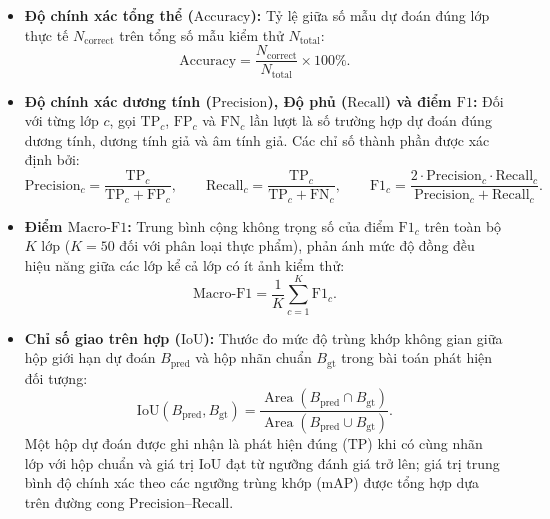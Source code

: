 \begin{itemize}[leftmargin=0.8cm, label=\textbullet, itemsep=3pt, topsep=2pt]
    \item \textbf{Độ chính xác tổng thể ($\mathrm{Accuracy}$):} Tỷ lệ giữa số mẫu dự đoán đúng lớp thực tế $N_{\mathrm{correct}}$ trên tổng số mẫu kiểm thử $N_{\mathrm{total}}$:
    \begin{equation}
        \mathrm{Accuracy} = \frac{N_{\mathrm{correct}}}{N_{\mathrm{total}}} \times 100\%.
        \label{eq:metric-accuracy}
    \end{equation}

    \item \textbf{Độ chính xác dương tính ($\mathrm{Precision}$), Độ phủ ($\mathrm{Recall}$) và điểm $\mathrm{F1}$:} Đối với từng lớp $c$, gọi $\mathrm{TP}_c$, $\mathrm{FP}_c$ và $\mathrm{FN}_c$ lần lượt là số trường hợp dự đoán đúng dương tính, dương tính giả và âm tính giả. Các chỉ số thành phần được xác định bởi:
    \begin{equation}
        \mathrm{Precision}_c = \frac{\mathrm{TP}_c}{\mathrm{TP}_c + \mathrm{FP}_c}, \qquad
        \mathrm{Recall}_c = \frac{\mathrm{TP}_c}{\mathrm{TP}_c + \mathrm{FN}_c}, \qquad
        \mathrm{F1}_c = \frac{2 \cdot \mathrm{Precision}_c \cdot \mathrm{Recall}_c}{\mathrm{Precision}_c + \mathrm{Recall}_c}.
        \label{eq:metric-prf1}
    \end{equation}

    \item \textbf{Điểm $\mathrm{Macro\text{-}F1}$:} Trung bình cộng không trọng số của điểm $\mathrm{F1}_c$ trên toàn bộ $K$ lớp ($K = 50$ đối với phân loại thực phẩm), phản ánh mức độ đồng đều hiệu năng giữa các lớp kể cả lớp có ít ảnh kiểm thử:
    \begin{equation}
        \mathrm{Macro\text{-}F1} = \frac{1}{K} \sum_{c=1}^{K} \mathrm{F1}_c.
        \label{eq:metric-macro-f1}
    \end{equation}

    \item \textbf{Chỉ số giao trên hợp ($\mathrm{IoU}$):} Thước đo mức độ trùng khớp không gian giữa hộp giới hạn dự đoán $B_{\mathrm{pred}}$ và hộp nhãn chuẩn $B_{\mathrm{gt}}$ trong bài toán phát hiện đối tượng:
    \begin{equation}
        \mathrm{IoU}(B_{\mathrm{pred}}, B_{\mathrm{gt}}) = \frac{\operatorname{Area}(B_{\mathrm{pred}} \cap B_{\mathrm{gt}})}{\operatorname{Area}(B_{\mathrm{pred}} \cup B_{\mathrm{gt}})}.
        \label{eq:metric-iou}
    \end{equation}
    Một hộp dự đoán được ghi nhận là phát hiện đúng ($\mathrm{TP}$) khi có cùng nhãn lớp với hộp chuẩn và giá trị $\mathrm{IoU}$ đạt từ ngưỡng đánh giá trở lên; giá trị trung bình độ chính xác theo các ngưỡng trùng khớp ($\mathrm{mAP}$) được tổng hợp dựa trên đường cong $\mathrm{Precision}$--$\mathrm{Recall}$.
\end{itemize}
